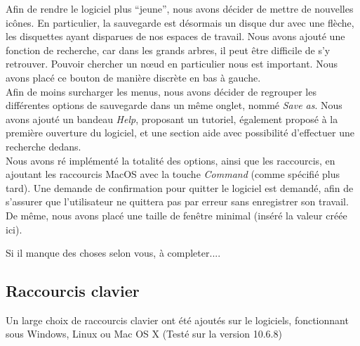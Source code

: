 \documentclass[12pt, a4paper]{article}
\begin{document}
Afin de rendre le logiciel plus ``jeune'', nous avons décider de mettre de nouvelles icônes. En particulier, la sauvegarde est désormais un disque dur avec une flèche, les disquettes ayant disparues de nos espaces de travail. Nous avons ajouté une fonction de recherche, car dans les grands arbres, il peut être difficile de s'y retrouver. Pouvoir chercher un nœud en particulier nous est important. Nous avons placé ce bouton de manière discrète en bas à gauche.\\


Afin de moins surcharger les menus, nous avons décider de regrouper les différentes options de sauvegarde dans un même onglet, nommé \emph{Save as}. Nous avons ajouté un bandeau \emph{Help}, proposant un tutoriel, également proposé à la première ouverture du logiciel, et une section aide avec possibilité d'effectuer une recherche dedans.\\


Nous avons ré implémenté la totalité des options, ainsi que les raccourcis, en ajoutant les raccourcis MacOS avec la touche \emph{Command} (comme spécifié plus tard). Une demande de confirmation pour quitter le logiciel est demandé, afin de s'assurer que l'utilisateur ne quittera pas par erreur sans enregistrer son travail. De même, nous avons placé une taille de fenêtre minimal (inséré la valeur créée ici).

Si il manque des choses selon vous, à completer....
\textcolor{NavyBlue}{\subsection{Raccourcis clavier}}

Un large choix de raccourcis clavier ont été ajoutés sur le logiciels, fonctionnant sous Windows, Linux ou Mac OS X (Testé sur la version 10.6.8)
\end{document}
